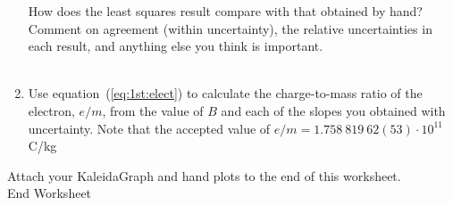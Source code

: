 \begin{enumerate}
\noindent How does the least squares result compare
with that obtained by hand? Comment on agreement (within uncertainty), the
relative uncertainties in each result, and anything else you think is 
important.  \\
\vspace*{3cm} \\

\item Use equation~(\ref{eq:1st:elect}) to calculate the charge-to-mass ratio
of the electron, $e/m$, from the value of $B$ and each of the slopes you 
obtained with uncertainty. Note that the accepted value of $e/m=1.758~819~62(53)\cdot 10^{11}$ C/kg \\

\end{enumerate}


\vfill
\noindent Attach your KaleidaGraph and hand plots to the end of this worksheet. \\
{\Large End Worksheet} 




\renewcommand{\thesection}{\thechapter.\arabic{section}}